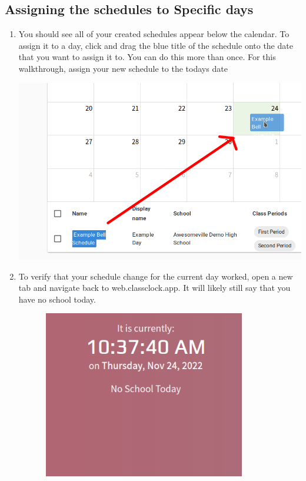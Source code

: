 \documentclass{article}
\begin{document}
\subsection{Assigning the schedules to Specific days}
\begin{enumerate}
\item {You should see all of your created schedules appear below the calendar. To assign it to a day, click and drag the blue
title of the schedule onto the date that you want to assign it to. You can do this more than once. For this
walkthrough, assign your new schedule to the todays date\newline
}
\begin{center}
\includegraphics[width=\textwidth]{images/dragging-schedule-arrow.png}
\end{center}
\item {To verify that your schedule change for the current day worked, open a new tab and navigate back to web.classclock.app.
It will likely still say that you have no school today.}
\begin{center}
\includegraphics[width=4.4366in,height=2.8764in]{images/no-school-day.png}

\end{center}
\end{enumerate}
\end{document}
